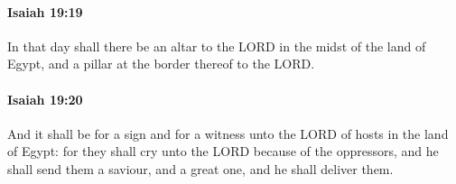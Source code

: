 		\paragraph{Isaiah 19:19} %
			\label{ISAIAH-19-19}

			In that day shall there be an altar to the LORD in the midst of the land of Egypt, and a pillar at the border thereof to the LORD.


		\paragraph{Isaiah 19:20} %
			\label{ISAIAH-19-20}

			And it shall be for a sign and for a witness unto the LORD of hosts in the land of Egypt: for they shall cry unto the LORD because of the oppressors, and he shall send them a saviour, and a great one, and he shall deliver them.


